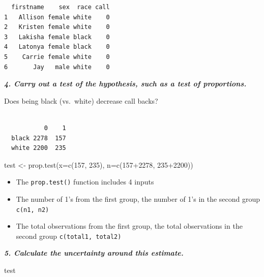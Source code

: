 \documentclass[
  letterpaper,
  DIV=11,
  numbers=noendperiod]{scrreprt}
\newenvironment{Shaded}{\begin{snugshade}}{\end{snugshade}}
\newcommand{\AttributeTok}[1]{\textcolor[rgb]{0.40,0.45,0.13}{#1}}
\newcommand{\DecValTok}[1]{\textcolor[rgb]{0.68,0.00,0.00}{#1}}
\newcommand{\FunctionTok}[1]{\textcolor[rgb]{0.28,0.35,0.67}{#1}}
\newcommand{\NormalTok}[1]{\textcolor[rgb]{0.00,0.23,0.31}{#1}}
\newcommand{\OtherTok}[1]{\textcolor[rgb]{0.00,0.23,0.31}{#1}}
\newcommand{\SpecialCharTok}[1]{\textcolor[rgb]{0.37,0.37,0.37}{#1}}
\providecommand{\tightlist}{%
  \setlength{\itemsep}{0pt}\setlength{\parskip}{0pt}}\usepackage{longtable,booktabs,array}
\begin{document}
\begin{verbatim}
  firstname    sex  race call
1   Allison female white    0
2   Kristen female white    0
3   Lakisha female black    0
4   Latonya female black    0
5    Carrie female white    0
6       Jay   male white    0
\end{verbatim}

\textbf{\emph{4. Carry out a test of the hypothesis, such as a test of
proportions.}}

Does being black (vs.~white) decrease call backs?

\begin{Shaded}
\end{Shaded}

\begin{verbatim}
       
           0    1
  black 2278  157
  white 2200  235
\end{verbatim}

\begin{Shaded}
\begin{Highlighting}[]
\NormalTok{test }\OtherTok{\textless{}{-}} \FunctionTok{prop.test}\NormalTok{(}\AttributeTok{x=}\FunctionTok{c}\NormalTok{(}\DecValTok{157}\NormalTok{, }\DecValTok{235}\NormalTok{), }\AttributeTok{n=}\FunctionTok{c}\NormalTok{(}\DecValTok{157}\SpecialCharTok{+}\DecValTok{2278}\NormalTok{, }\DecValTok{235}\SpecialCharTok{+}\DecValTok{2200}\NormalTok{))}
\end{Highlighting}
\end{Shaded}

\begin{itemize}
\tightlist
\item
  The \texttt{prop.test()} function includes 4 inputs
\item
  The number of 1's from the first group, the number of 1's in the
  second group \texttt{c(n1,\ n2)}
\item
  The total observations from the first group, the total observations in
  the second group \texttt{c(total1,\ total2)}
\end{itemize}

\textbf{\emph{5. Calculate the uncertainty around this estimate.}}

\begin{Shaded}
\begin{Highlighting}[]
\NormalTok{test}
\end{Highlighting}
\end{Shaded}
\end{document}
